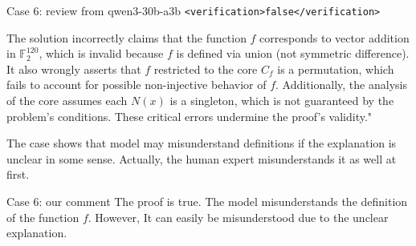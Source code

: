 \documentclass{article} %
\begin{document}
\begin{promptbox}{Case 6: review from qwen3-30b-a3b}
\verb|<verification>false</verification>|

The solution incorrectly claims that the function $ f $ corresponds to vector addition in $ \mathbb{F}_2^{120} $, which is invalid because $ f $ is defined via union (not symmetric difference). It also wrongly asserts that $ f $ restricted to the core $ C_f $ is a permutation, which fails to account for possible non-injective behavior of $ f $. Additionally, the analysis of the core assumes each $ N(x) $ is a singleton, which is not guaranteed by the problem's conditions. These critical errors undermine the proof's validity."
 
\end{promptbox}

The case shows that model may misunderstand definitions if the explanation is unclear in some sense. Actually, the human expert misunderstands it as well at first.

\begin{promptbox}{Case 6: our comment}
  The proof is true. The model misunderstands the definition of the function $f$. However, It can easily be misunderstood due to the unclear explanation.
\end{promptbox}
\end{document}
